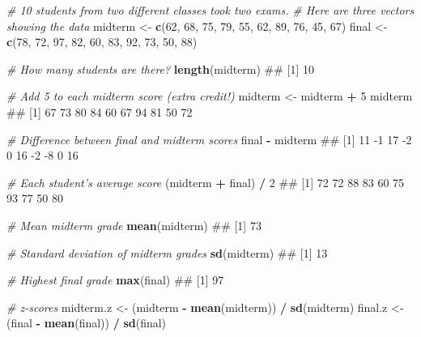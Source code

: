 \documentclass[]{book}
\newenvironment{Shaded}{\begin{snugshade}}{\end{snugshade}}
\newcommand{\KeywordTok}[1]{\textcolor[rgb]{0.13,0.29,0.53}{\textbf{#1}}}
\newcommand{\DecValTok}[1]{\textcolor[rgb]{0.00,0.00,0.81}{#1}}
\newcommand{\StringTok}[1]{\textcolor[rgb]{0.31,0.60,0.02}{#1}}
\newcommand{\CommentTok}[1]{\textcolor[rgb]{0.56,0.35,0.01}{\textit{#1}}}
\newcommand{\OperatorTok}[1]{\textcolor[rgb]{0.81,0.36,0.00}{\textbf{#1}}}
\newcommand{\NormalTok}[1]{#1}
\theoremstyle{definition}
\theoremstyle{definition}
\theoremstyle{remark}
\begin{document}
\begin{Shaded}
\begin{Highlighting}[]
\CommentTok{# 10 students from two different classes took two exams.}
\CommentTok{#  Here are three vectors showing the data}
\NormalTok{midterm <-}\StringTok{ }\KeywordTok{c}\NormalTok{(}\DecValTok{62}\NormalTok{, }\DecValTok{68}\NormalTok{, }\DecValTok{75}\NormalTok{, }\DecValTok{79}\NormalTok{, }\DecValTok{55}\NormalTok{, }\DecValTok{62}\NormalTok{, }\DecValTok{89}\NormalTok{, }\DecValTok{76}\NormalTok{, }\DecValTok{45}\NormalTok{, }\DecValTok{67}\NormalTok{)}
\NormalTok{final <-}\StringTok{ }\KeywordTok{c}\NormalTok{(}\DecValTok{78}\NormalTok{, }\DecValTok{72}\NormalTok{, }\DecValTok{97}\NormalTok{, }\DecValTok{82}\NormalTok{, }\DecValTok{60}\NormalTok{, }\DecValTok{83}\NormalTok{, }\DecValTok{92}\NormalTok{, }\DecValTok{73}\NormalTok{, }\DecValTok{50}\NormalTok{, }\DecValTok{88}\NormalTok{)}

\CommentTok{# How many students are there?}
\KeywordTok{length}\NormalTok{(midterm)}
\NormalTok{## [1] 10}

\CommentTok{# Add 5 to each midterm score (extra credit!)}
\NormalTok{midterm <-}\StringTok{ }\NormalTok{midterm }\OperatorTok{+}\StringTok{ }\DecValTok{5}
\NormalTok{midterm}
\NormalTok{##  [1] 67 73 80 84 60 67 94 81 50 72}

\CommentTok{# Difference between final and midterm scores}
\NormalTok{final }\OperatorTok{-}\StringTok{ }\NormalTok{midterm}
\NormalTok{##  [1] 11 -1 17 -2  0 16 -2 -8  0 16}

\CommentTok{# Each student's average score}
\NormalTok{(midterm }\OperatorTok{+}\StringTok{ }\NormalTok{final) }\OperatorTok{/}\StringTok{ }\DecValTok{2}
\NormalTok{##  [1] 72 72 88 83 60 75 93 77 50 80}

\CommentTok{# Mean midterm grade}
\KeywordTok{mean}\NormalTok{(midterm)}
\NormalTok{## [1] 73}

\CommentTok{# Standard deviation of midterm grades}
\KeywordTok{sd}\NormalTok{(midterm)}
\NormalTok{## [1] 13}

\CommentTok{# Highest final grade}
\KeywordTok{max}\NormalTok{(final)}
\NormalTok{## [1] 97}

\CommentTok{# z-scores}
\NormalTok{midterm.z <-}\StringTok{ }\NormalTok{(midterm }\OperatorTok{-}\StringTok{ }\KeywordTok{mean}\NormalTok{(midterm)) }\OperatorTok{/}\StringTok{ }\KeywordTok{sd}\NormalTok{(midterm)}
\NormalTok{final.z <-}\StringTok{ }\NormalTok{(final }\OperatorTok{-}\StringTok{ }\KeywordTok{mean}\NormalTok{(final)) }\OperatorTok{/}\StringTok{ }\KeywordTok{sd}\NormalTok{(final)}
\end{Highlighting}
\end{Shaded}
\end{document}
